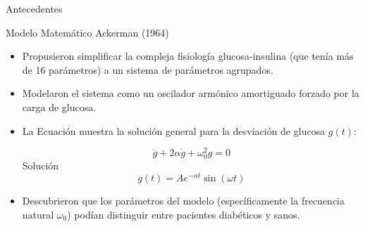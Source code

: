 \documentclass{beamer}
\begin{document}

    \begin{frame}{Antecedentes}
        \justifying

        \begin{block}{Modelo Matemático Ackerman (1964)}
        \end{block}

        \begin{itemize}
            \item Propusieron simplificar la compleja fisiología glucosa-insulina (que tenía más de 16 parámetros) a un sistema de parámetros agrupados.
            \item Modelaron el sistema como un oscilador armónico amortiguado forzado por la carga de glucosa.
            \item La Ecuación muestra la solución general para la desviación de glucosa $g(t)$:

            $$\ddot{g} + 2\alpha \dot{g} + \omega_0^2 g = 0$$
            Solución
            $$g(t) = A e^{- \alpha t} \sin (\omega t)$$

            
            \item Descubrieron que los parámetros del modelo (específicamente la frecuencia natural $\omega_0$) podían distinguir entre pacientes diabéticos y sanos.
        \end{itemize}

        


        

        

	\end{frame}
\end{document}
